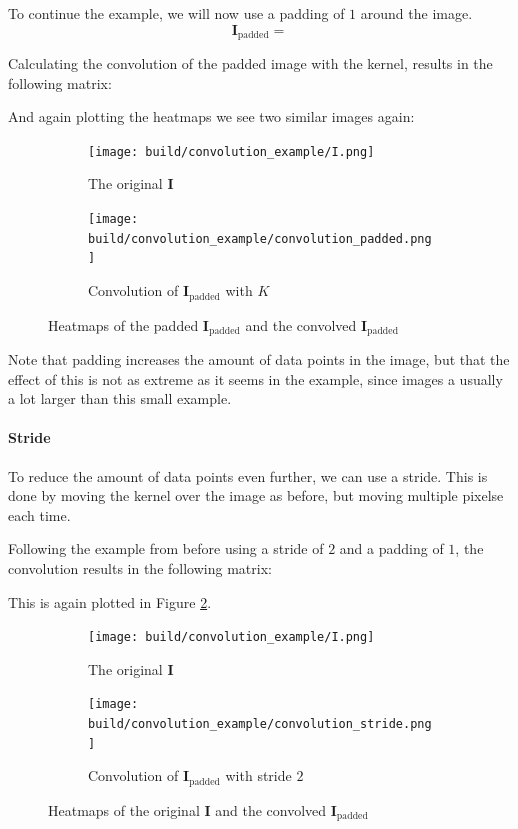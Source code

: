 \documentclass[11pt,a4paper]{article}
\newcommand{\bm}[1]{\textbf{#1}}
\newcommand{\matsym}[1]{\bm{#1}}
\begin{document}
To continue the example, we will now use a padding of $1$ around the image.
\begin{equation}
    \matsym{I}_{\text{padded}} = 
\end{equation}

Calculating the convolution of the padded image with the kernel, results in the following matrix:
\begin{equation}
    
\end{equation}

And again plotting the heatmaps we see two similar images again:
\begin{figure}[h]
\centering
\begin{subfigure}{0.45\textwidth}
    \texttt{[image: build/convolution\_example/I.png]}
    \caption{The original $\matsym{I}$}
\end{subfigure}
\begin{subfigure}{0.45\textwidth}
    \texttt{[image: build/convolution\_example/convolution\_padded.png]}
    \caption{Convolution of $\matsym{I}_{\text{padded}}$ with $K$}
\end{subfigure}
\caption{Heatmaps of the padded $\matsym{I}_{\text{padded}}$ and the convolved $\matsym{I}_{\text{padded}}$}
\label{fig:convolution_example_padded}
\end{figure}

Note that padding increases the amount of data points in the image, but that
the effect of this is not as extreme as it seems in the example, since images a usually
a lot larger than this small example.

\paragraph{Stride}
To reduce the amount of data points even further, we can use a stride.
This is done by moving the kernel over the image as before, but moving multiple pixelse each time.

Following the example from before using a stride of $2$ and a padding of $1$, the convolution results in the following matrix:
\begin{equation}
    
\end{equation}

This is again plotted in Figure \ref{fig:convolution_example_stride}.

\begin{figure}[ht]
\centering
\begin{subfigure}{0.45\textwidth}
    \texttt{[image: build/convolution\_example/I.png]}
    \caption{The original $\matsym{I}$}
\end{subfigure}
\begin{subfigure}{0.45\textwidth}
    \texttt{[image: build/convolution\_example/convolution\_stride.png]}
    \caption{Convolution of $\matsym{I}_{\text{padded}}$ with stride $2$}
\end{subfigure}
\caption{Heatmaps of the original $\matsym{I}$ and the convolved $\matsym{I}_{\text{padded}}$}
\label{fig:convolution_example_stride}
\end{figure}
\end{document}
